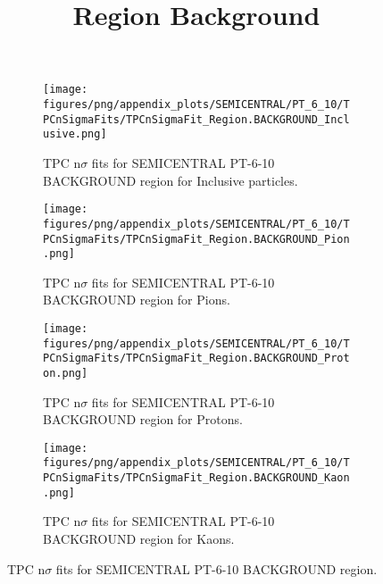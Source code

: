             \begin{figure}[H]
                \title{Region Background}
                \begin{subfigure}[b]{0.5\textwidth}
                    \centering
                    \texttt{[image: figures/png/appendix\_plots/SEMICENTRAL/PT\_6\_10/TPCnSigmaFits/TPCnSigmaFit\_Region.BACKGROUND\_Inclusive.png]}
                    \caption{TPC n$\sigma$ fits for SEMICENTRAL PT-6-10 BACKGROUND region for Inclusive particles.}
                    \label{fig:appendix_SEMICENTRAL_PT-6-10_BACKGROUND_Inclusive}
                \end{subfigure}
                \begin{subfigure}[b]{0.5\textwidth}
                    \centering
                    \texttt{[image: figures/png/appendix\_plots/SEMICENTRAL/PT\_6\_10/TPCnSigmaFits/TPCnSigmaFit\_Region.BACKGROUND\_Pion.png]}
                    \caption{TPC n$\sigma$ fits for SEMICENTRAL PT-6-10 BACKGROUND region for Pions.}
                    \label{fig:appendix_SEMICENTRAL_PT-6-10_BACKGROUND_Pion}
                \end{subfigure}
                \begin{subfigure}[b]{0.5\textwidth}
                    \centering
                    \texttt{[image: figures/png/appendix\_plots/SEMICENTRAL/PT\_6\_10/TPCnSigmaFits/TPCnSigmaFit\_Region.BACKGROUND\_Proton.png]}
                    \caption{TPC n$\sigma$ fits for SEMICENTRAL PT-6-10 BACKGROUND region for Protons.}
                    \label{fig:appendix_SEMICENTRAL_PT-6-10_BACKGROUND_Proton}
                \end{subfigure}
                \begin{subfigure}[b]{0.5\textwidth}
                    \centering
                    \texttt{[image: figures/png/appendix\_plots/SEMICENTRAL/PT\_6\_10/TPCnSigmaFits/TPCnSigmaFit\_Region.BACKGROUND\_Kaon.png]}
                    \caption{TPC n$\sigma$ fits for SEMICENTRAL PT-6-10 BACKGROUND region for Kaons.}
                    \label{fig:appendix_SEMICENTRAL_PT-6-10_BACKGROUND_Kaon}
                \end{subfigure}
                \caption{TPC n$\sigma$ fits for SEMICENTRAL PT-6-10 BACKGROUND region.}
                \label{fig:appendix_SEMICENTRAL_PT-6-10_BACKGROUND}
            \end{figure}
            \clearpage
            
    